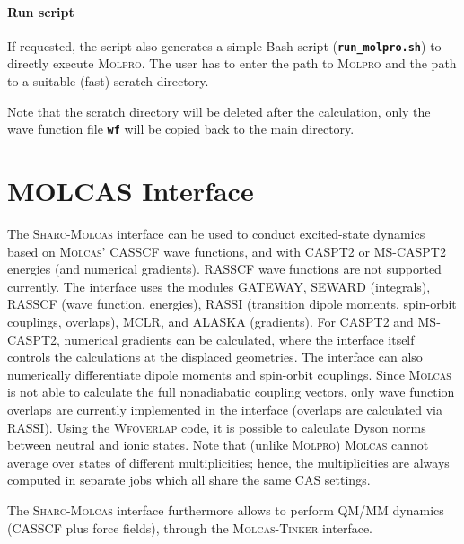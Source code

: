 \documentclass[a4paper,10pt,DIV=15,openany,twoside=false]{scrbook}
\newcommand{\sharc}{\textsc{Sharc}}
\newcommand{\ttt}[1]{\textbf{\texttt{#1}}}
\begin{document}
\paragraph{Run script}

If requested, the script also generates a simple Bash script (\ttt{run\_molpro.sh}) to directly execute \textsc{Molpro}. The user has to enter the path to \textsc{Molpro} and the path to a suitable (fast) scratch directory. 

Note that the scratch directory will be deleted after the calculation, only the wave function file \ttt{wf} will be copied back to the main directory.








\section{MOLCAS Interface}\label{sec:int:molcas}

The \sharc-\textsc{Molcas} interface can be used to conduct excited-state dynamics based on \textsc{Molcas}' CASSCF wave functions, and with CASPT2 or MS-CASPT2 energies (and numerical gradients). 
RASSCF wave functions are not supported currently. 
The interface uses the modules GATEWAY, SEWARD (integrals), RASSCF (wave function, energies), RASSI (transition dipole moments, spin-orbit couplings, overlaps), MCLR, and ALASKA (gradients). 
For CASPT2 and MS-CASPT2, numerical gradients can be calculated, where the interface itself controls the calculations at the displaced geometries. 
The interface can also numerically differentiate dipole moments and spin-orbit couplings.
Since \textsc{Molcas} is not able to calculate the full nonadiabatic coupling vectors, only wave function overlaps are currently implemented in the interface (overlaps are calculated via RASSI). 
Using the \textsc{Wfoverlap} code, it is possible to calculate Dyson norms between neutral and ionic states.
Note that (unlike \textsc{Molpro}) \textsc{Molcas} cannot average over states of different multiplicities; hence, the multiplicities are always computed in separate jobs which all share the same CAS settings.

The \sharc-\textsc{Molcas} interface furthermore allows to perform QM/MM dynamics (CASSCF plus force fields), through the \textsc{Molcas}-\textsc{Tinker} interface. 
\end{document}
